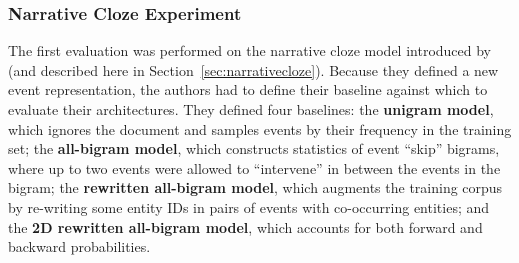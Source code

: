 \subsubsection{Narrative Cloze Experiment}
The first evaluation was performed on the narrative cloze model introduced by \citep{chambers2008unsupervised} (and described here in Section~\ref{sec:narrativecloze}). Because they defined a new event representation, the authors had to define their baseline against which to evaluate their architectures. They defined four baselines: the \textbf{unigram model}, which ignores the document and samples events by their frequency in the training set; the \textbf{all-bigram model}, which constructs statistics of event ``skip'' bigrams, where up to two events were allowed to ``intervene'' in between the events in the bigram; the \textbf{rewritten all-bigram model}, which augments the training corpus by re-writing some entity IDs in pairs of events with co-occurring entities; and the \textbf{2D rewritten all-bigram model}, which accounts for both forward and backward probabilities.

